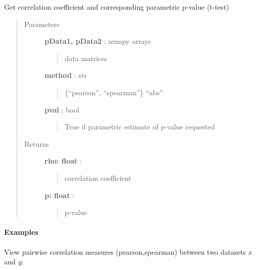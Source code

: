 \documentclass[letterpaper,10pt,english]{sphinxmanual}
\begin{document}
\begin{fulllineitems}
\label{index:halla.distance.cor}
Get correlation coefficient and corresponding parametric p-value (t-test)
\begin{quote}\begin{description}
\item[{Parameters}] \leavevmode
\textbf{pData1, pData2} : numpy arrays
\begin{quote}

data matrices
\end{quote}

\textbf{method} : str
\begin{quote}

\{``pearson'', ``spearman''\}
``abs''
\end{quote}

\textbf{pval} : bool
\begin{quote}

True if parametric estimate of p-value requested
\end{quote}

\item[{Returns}] \leavevmode
\textbf{rho: float} :
\begin{quote}

correlation coefficient
\end{quote}

\textbf{p: float} :
\begin{quote}

p-value
\end{quote}

\end{description}\end{quote}
\paragraph{Examples}

View pairwise correlation measures (pearson,spearman) between two datasets \emph{x} and \emph{y}:


\end{fulllineitems}
\end{document}

